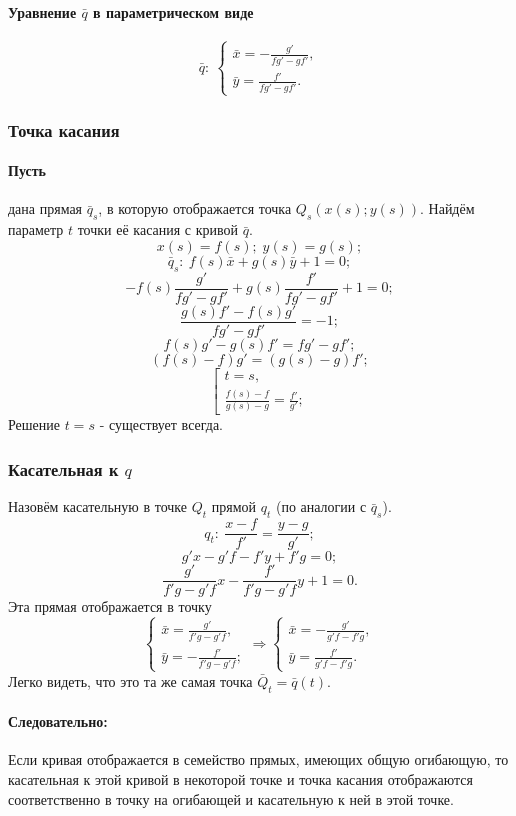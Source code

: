 \paragraph{Уравнение $\bar{q}$ в параметрическом виде}
$$\bar{q}:
\:
\left\{
\begin{gathered}
	\bar{x} =  -\frac{g'}{f g' - g f'},\\
	\bar{y} =  \frac{f'}{f g' - g f'}.
\end{gathered}
\right.
$$
\subsubsection{Точка касания}
\paragraph{Пусть} дана прямая $\bar{q}_s$, в которую отображается точка $Q_s (x(s); y(s))$. Найдём параметр $t$ точки её касания с кривой $\bar{q}$.
$$x(s) = f(s);\; y(s)= g(s);$$
$$\bar{q}_s: \: f(s)\bar{x} + g(s)\bar{y} + 1 = 0;$$
$$-f(s)\frac{g'}{f g' - g f'} + g(s)\frac{f'}{f g' - g f'} + 1 = 0;$$
$$\frac{g(s) f' - f(s) g'}{f g' - g f'} = -1;$$
$$f(s) g' - g(s) f' = f g' - g f';$$
$$(f(s) - f) g' = (g(s) - g) f';$$
$$\left[
\begin{gathered}
	t = s,\\
	\frac{f(s) - f}{g(s) - g} = \frac{f'}{g'};
\end{gathered}
\right.
$$
Решение $t = s$ - существует всегда.

\subsubsection{Касательная к $q$}
Назовём касательную в точке $Q_t$ прямой $q_t$ (по аналогии с $\bar{q}_s$).
$$q_t:\: \frac{x - f}{f'} = \frac{y - g}{g'};$$
$$g'x - g'f - f'y + f'g = 0;$$
$$\frac{g'}{f'g - g'f}x - \frac{f'}{f'g - g'f}y + 1 = 0.$$
Эта прямая отображается в точку 
$$
\left\{
\begin{gathered}
	\bar{x} = \frac{g'}{f'g - g'f}, \\
	\bar{y} = - \frac{f'}{f'g - g'f};
\end{gathered}
\right.
\Rightarrow
\left\{
\begin{gathered}
	\bar{x} = - \frac{g'}{g'f - f'g}, \\
	\bar{y} = \frac{f'}{g'f - f'g}.
\end{gathered}
\right.
$$
Легко видеть, что это та же самая точка $\bar{Q}_t = \bar{q}(t)$.

\paragraph{Следовательно:} Если кривая отображается в семейство прямых, имеющих общую огибающую, то касательная к этой кривой в некоторой точке и точка касания отображаются соответственно в точку на огибающей и касательную к ней в этой точке.


